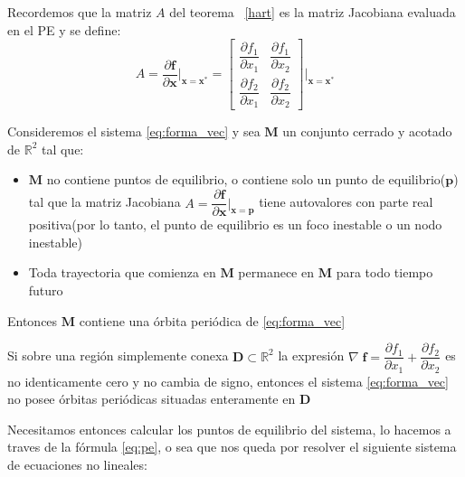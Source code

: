 \documentclass[10pt]{article}
\begin{document}
Recordemos que la matriz $A$ del teorema ~\ref{hart} es la matriz Jacobiana evaluada en el PE y se define:
\begin{equation}
A=\dfrac{\partial \mathbf{f}}{\partial \mathbf{x}}\bigg\vert_{\mathbf{x}=\mathbf{x}^{*}}=
\begin{bmatrix}
 \dfrac{\partial f_1}{\partial x_1}& \dfrac{\partial f_1}{\partial x_2} \\ 
\dfrac{\partial f_2}{\partial x_1}& \dfrac{\partial f_2}{\partial x_2}
\end{bmatrix} 
\bigg\vert_{\mathbf{x}=\mathbf{x}^{*}}
\label{eq:jaco}
\end{equation}

\begin{lem}
Consideremos el sistema \eqref{eq:forma_vec} y sea $\mathbf{M}$ un conjunto  cerrado y acotado de $\mathbb{R}^2$ tal que:
\begin{itemize}
\item $\mathbf{M}$ no contiene puntos de equilibrio, o contiene solo un punto de equilibrio($\mathbf{p}$) tal que la matriz Jacobiana $A=\dfrac{\partial \mathbf{f}}{\partial \mathbf{x}}\bigg\vert_{\mathbf{x}=\mathbf{p}}$ tiene autovalores con parte real positiva(por lo tanto, el punto de equilibrio es un foco inestable o un nodo inestable)

\item Toda trayectoria que comienza en $\mathbf{M}$ permanece en $\mathbf{M}$ para todo tiempo futuro
\end{itemize}
Entonces $\mathbf{M}$ contiene una órbita periódica de \eqref{eq:forma_vec}
\end{lem}


\begin{lem}

Si sobre una región simplemente conexa $\mathbf{D} \subset \mathbb{R}^2$ la expresión $\nabla \; \mathbf{f}=\dfrac{\partial f_1}{\partial x_1}+\dfrac{\partial f_2}{\partial x_2}$ es no identicamente cero y no cambia de signo, entonces el sistema \eqref{eq:forma_vec} no posee órbitas periódicas situadas enteramente en $\mathbf{D}$

\label{bendixon}

\end{lem}

Necesitamos entonces calcular los puntos de equilibrio del sistema, lo hacemos a traves de la fórmula \eqref{eq:pe}, o sea que nos queda por resolver el siguiente sistema de ecuaciones no lineales:
\end{document}

